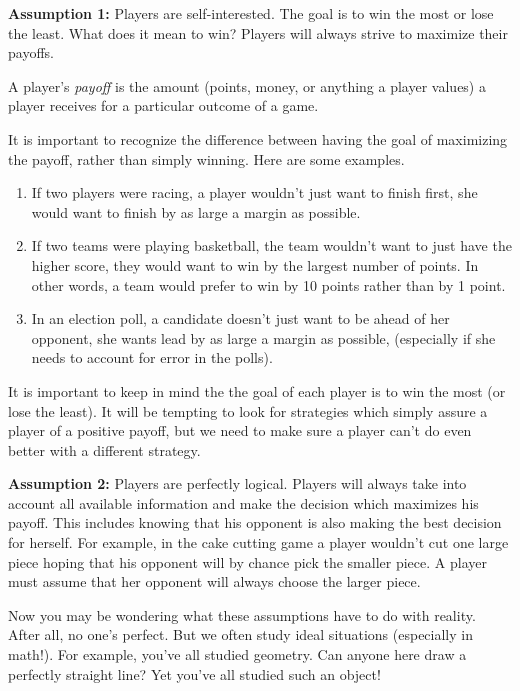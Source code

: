 
{\bf Assumption 1:} Players are self-interested. The goal is to win the most or lose the least. What does it mean to win? Players will always strive to maximize their payoffs. 

A player's {\it payoff} is the amount (points, money, or anything a player values) a player receives for a particular outcome of a game.

It is important to recognize the difference between having the goal of maximizing the payoff, rather than simply winning. Here are some examples.
\begin{enumerate}
\item If two players were racing, a player wouldn't just want to finish first, she would want to finish by as large a margin as possible.
\item If two teams were playing basketball, the team wouldn't want to just have the higher score, they would want to win by the largest number of points. In other words, a team would prefer to win by 10 points rather than by 1 point.
\item In an election poll, a candidate doesn't just want to be ahead of her opponent, she wants lead by as large a margin as possible, (especially if she needs to account for error in the polls).
\end{enumerate}

It is important to keep in mind the the goal of each player is to win the most (or lose the least). It will be tempting to look for strategies which simply assure a player of a positive payoff, but we need to make sure a player can't do even better with a different strategy. 

{\bf Assumption 2:}  Players are perfectly logical. Players will always take into account all available information and make the decision which maximizes his payoff. This includes knowing that his opponent is also making the best decision for herself. 
For example, in the cake cutting game a player wouldn't cut one large piece hoping that his opponent will by chance pick the smaller piece. A player must assume that her opponent will always choose the larger piece.

Now you may be wondering what these assumptions have to do with reality. After all, no one's perfect. But we often study ideal situations (especially in math!). For example, you've all studied geometry. Can anyone here draw a perfectly straight line? Yet you've all studied such an object!


